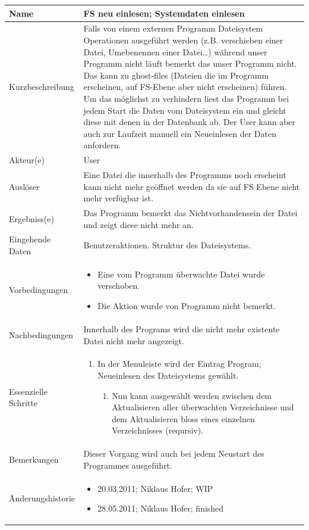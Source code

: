 \documentclass[10pt,paper=a4,final]{scrartcl}
\begin{document}
\begin{tabularx}{\textwidth}{|l|X|}
\hline
\bf Name		& {\bf FS neu einlesen; Systemdaten einlesen} \\ \hline
Kurzbeschreibung	& Falls von einem externen Programm Dateisystem Operationen ausgeführt werden (z.B. verschieben einer Datei, Umebenennen einer Datei\ldots) während unser Programm nicht läuft bemerkt das unser Programm nicht.
Das kann zu ghost-files (Dateien die im Programm erscheinen, auf FS-Ebene aber nicht erscheinen) führen.
Um das möglichst zu verhindern liest das Programm bei jedem Start die Daten vom Dateisystem ein und gleicht diese mit denen in der Datenbank ab.
Der User kann aber auch zur Laufzeit manuell ein Neueinlesen der Daten anfordern. \\ \hline
Akteur(e)		& User \\ \hline
Ausl\"oser		& Eine Datei die innerhalb des Programms noch erscheint kann nicht mehr geöffnet werden da sie auf FS Ebene nicht mehr verfügbar ist. \\ \hline
Ergebniss(e)		& Das Programm bemerkt das Nichtvorhandensein der Datei und zeigt diese nicht mehr an. \\ \hline
Eingehende Daten	& Benutzeraktionen. Struktur des Dateisystems. \\ \hline
Vorbedingungen		& \begin{itemize}
  \item Eine vom Programm überwachte Datei wurde verschoben.
  \item Die Aktion wurde von Programm nicht bemerkt. \end{itemize} \\ \hline
Nachbedingungen		& Innerhalb des Programs wird die nicht mehr existente Datei nicht mehr angezeigt. \\ \hline
Essenzielle Schritte	& \begin{enumerate}
  \item In der Menuleiste wird der Eintrag Program; Neueinlesen des Dateisystems gewählt. \begin{enumerate}
      \item Nun kann ausgewählt werden zwischen dem Aktualisieren aller überwachten Verzeichnisse und dem Aktualisieren bloss eines einzelnen Verzeichnisses (reqursiv). \end{enumerate} \end{enumerate}\\ \hline
Bemerkungen		& Dieser Vorgang wird auch bei jedem Neustart des Programmes ausgeführt. \\ \hline
\"Anderungshistorie	& \begin{itemize}
  \item 20.03.2011; Niklaus Hofer; WIP
  \item 28.05.2011; Niklaus Hofer; finished \end{itemize} \\ \hline
\end{tabularx}
\end{document}
